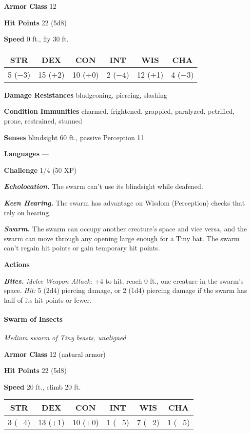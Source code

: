 \documentclass[
]{article}
\begin{document}
\textbf{Armor Class} 12

\textbf{Hit Points} 22 (5d8)

\textbf{Speed} 0 ft., fly 30 ft.

\begin{longtable}[]{@{}cccccc@{}}
\toprule
STR & DEX & CON & INT & WIS & CHA\tabularnewline
\midrule
\endhead
5 (−3) & 15 (+2) & 10 (+0) & 2 (−4) & 12 (+1) & 4 (−3)\tabularnewline
\bottomrule
\end{longtable}

\textbf{Damage Resistances} bludgeoning, piercing, slashing

\textbf{Condition Immunities} charmed, frightened, grappled, paralyzed,
petrified, prone, restrained, stunned

\textbf{Senses} blindsight 60 ft., passive Perception 11

\textbf{Languages} ---

\textbf{Challenge} 1/4 (50 XP)

\emph{\textbf{Echolocation.}} The swarm can't use its blindsight while
deafened.

\emph{\textbf{Keen Hearing.}} The swarm has advantage on Wisdom
(Perception) checks that rely on hearing.

\emph{\textbf{Swarm.}} The swarm can occupy another creature's space and
vice versa, and the swarm can move through any opening large enough for
a Tiny bat. The swarm can't regain hit points or gain temporary hit
points.

\textbf{Actions}

\emph{\textbf{Bites.}} \emph{Melee Weapon Attack:} +4 to hit, reach 0
ft., one creature in the swarm's space. \emph{Hit:} 5 (2d4) piercing
damage, or 2 (1d4) piercing damage if the swarm has half of its hit
points or fewer.

\hypertarget{swarm-of-insects}{%
\paragraph{Swarm of Insects}\label{swarm-of-insects}}

\emph{Medium swarm of Tiny beasts, unaligned}

\textbf{Armor Class} 12 (natural armor)

\textbf{Hit Points} 22 (5d8)

\textbf{Speed} 20 ft., climb 20 ft.

\begin{longtable}[]{@{}cccccc@{}}
\toprule
STR & DEX & CON & INT & WIS & CHA\tabularnewline
\midrule
\endhead
3 (−4) & 13 (+1) & 10 (+0) & 1 (−5) & 7 (−2) & 1 (−5)\tabularnewline
\bottomrule
\end{longtable}
\end{document}
